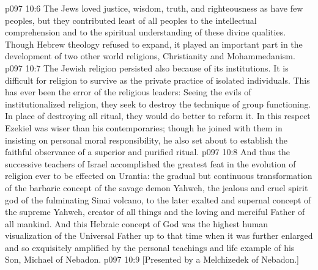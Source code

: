 \vs p097 10:6 The Jews loved justice, wisdom, truth, and righteousness as have few peoples, but they contributed least of all peoples to the intellectual comprehension and to the spiritual understanding of these divine qualities. Though Hebrew theology refused to expand, it played an important part in the development of two other world religions, Christianity and Mohammedanism.
\vs p097 10:7 The Jewish religion persisted also because of its institutions. It is difficult for religion to survive as the private practice of isolated individuals. This has ever been the error of the religious leaders: Seeing the evils of institutionalized religion, they seek to destroy the technique of group functioning. In place of destroying all ritual, they would do better to reform it. In this respect Ezekiel was wiser than his contemporaries; though he joined with them in insisting on personal moral responsibility, he also set about to establish the faithful observance of a superior and purified ritual.
\vs p097 10:8 \pc And thus the successive teachers of Israel accomplished the greatest feat in the evolution of religion ever to be effected on Urantia: the gradual but continuous transformation of the barbaric concept of the savage demon Yahweh, the jealous and cruel spirit god of the fulminating Sinai volcano, to the later exalted and supernal concept of the supreme Yahweh, creator of all things and the loving and merciful Father of all mankind. And this Hebraic concept of God was the highest human visualization of the Universal Father up to that time when it was further enlarged and so exquisitely amplified by the personal teachings and life example of his Son, Michael of Nebadon.
\vsetoff
\vs p097 10:9 [Presented by a Melchizedek of Nebadon.]
\quizlink
